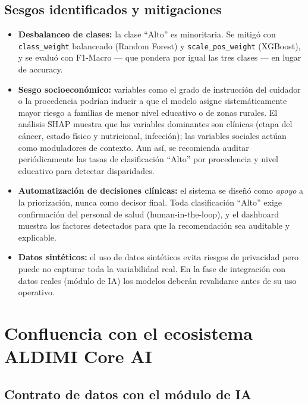 \subsection{Sesgos identificados y mitigaciones}

\begin{itemize}[leftmargin=1.6em]
  \item \textbf{Desbalanceo de clases:} la clase ``Alto'' es minoritaria.
        Se mitigó con \texttt{class\_weight} balanceado (Random Forest) y
        \texttt{scale\_pos\_weight} (XGBoost), y se evaluó con F1-Macro
        --- que pondera por igual las tres clases --- en lugar de accuracy.
  \item \textbf{Sesgo socioeconómico:} variables como el grado de
        instrucción del cuidador o la procedencia podrían inducir a que el
        modelo asigne sistemáticamente mayor riesgo a familias de menor
        nivel educativo o de zonas rurales. El análisis SHAP muestra que
        las variables dominantes son clínicas (etapa del cáncer, estado
        físico y nutricional, infección); las variables sociales actúan
        como moduladores de contexto. Aun así, se recomienda auditar
        periódicamente las tasas de clasificación ``Alto'' por procedencia
        y nivel educativo para detectar disparidades.
  \item \textbf{Automatización de decisiones clínicas:} el sistema se
        diseñó como \emph{apoyo} a la priorización, nunca como decisor
        final. Toda clasificación ``Alto'' exige confirmación del personal
        de salud (human-in-the-loop), y el dashboard muestra los factores
        detectados para que la recomendación sea auditable y explicable.
  \item \textbf{Datos sintéticos:} el uso de datos sintéticos evita riesgos
        de privacidad pero puede no capturar toda la variabilidad real. En
        la fase de integración con datos reales (módulo de IA) los modelos
        deberán revalidarse antes de su uso operativo.
\end{itemize}

\section{Confluencia con el ecosistema ALDIMI Core AI}

\subsection{Contrato de datos con el módulo de IA}

